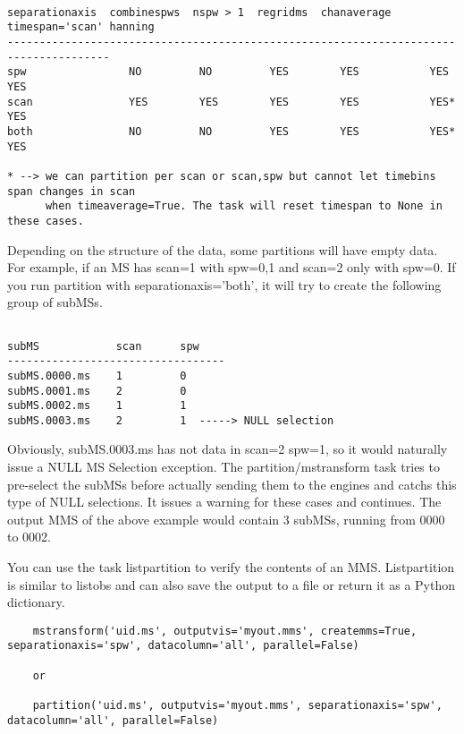\begin{verbatim}

separationaxis  combinespws  nspw > 1  regridms  chanaverage  timespan='scan' hanning
--------------------------------------------------------------------------------------
spw                NO         NO         YES        YES           YES           YES
scan               YES        YES        YES        YES           YES*          YES
both               NO         NO         YES        YES           YES*          YES

* --> we can partition per scan or scan,spw but cannot let timebins span changes in scan
      when timeaverage=True. The task will reset timespan to None in these cases.

\end{verbatim}

Depending on the structure of the data, some partitions will have empty data.
For example, if an MS has scan=1 with spw=0,1 and scan=2 only with spw=0. If
you run partition with separationaxis='both', it will try to create the
following group of subMSs.

\begin{verbatim}

subMS            scan      spw
----------------------------------
subMS.0000.ms    1         0
subMS.0001.ms    2         0
subMS.0002.ms    1         1
subMS.0003.ms    2         1  -----> NULL selection

\end{verbatim}

Obviously, subMS.0003.ms has not data in scan=2 spw=1, so it would naturally
issue a NULL MS Selection exception. The partition/mstransform task tries to
pre-select the subMSs before actually sending them to the engines and catchs 
this type of NULL selections. It issues a warning for these cases and continues.
The output MMS of the above example would contain 3 subMSs, running from 0000
to 0002.

You can use the task listpartition to verify the contents of an MMS.
Listpartition is similar to listobs and can also save the output to a file
or return it as a Python dictionary.

\begin{verbatim}
    mstransform('uid.ms', outputvis='myout.mms', createmms=True, separationaxis='spw', datacolumn='all', parallel=False)
    
    or
    
    partition('uid.ms', outputvis='myout.mms', separationaxis='spw', datacolumn='all', parallel=False)
    
\end{verbatim}

